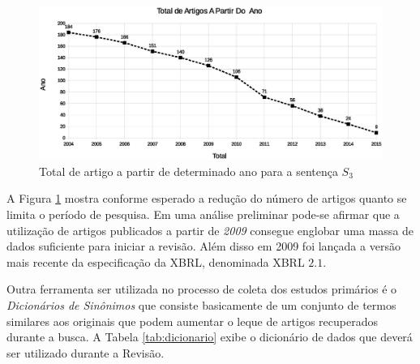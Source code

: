 \documentclass{article}
\begin{document}
\begin{figure}[h]
\centering
\label{fig:graph_artigos_ano}
\includegraphics[width=15cm]{../img/graph_01.eps}
\caption{Total de artigo a partir de determinado ano para a sentença $S_3$}
\end{figure}

A Figura \ref{fig:graph_artigos_ano} mostra conforme esperado a
redução do número de artigos quanto se limita o período de
pesquisa. Em uma análise preliminar pode-se afirmar que a utilização
de artigos publicados a partir de \textit{2009} consegue englobar uma massa de
dados suficiente para iniciar a revisão. Além disso em 2009 foi lançada a
versão mais recente da especificação da XBRL\cite{xbrl_conceitos_aplicacoes},
denominada XBRL $2.1$.

Outra ferramenta ser utilizada no processo de coleta dos estudos primários é o
\textit{Dicionários de Sinônimos} que consiste basicamente de um conjunto de
termos similares aos originais que podem aumentar o leque de artigos
recuperados durante a busca. A Tabela \ref{tab:dicionario} exibe o dicionário de dados que deverá ser utilizado durante a Revisão.

\begin{table}[ht]
\centering
{}
\caption{Dicionário de Sinônimos}
\label{tab:dicionario}
\end{table}
\end{document}

